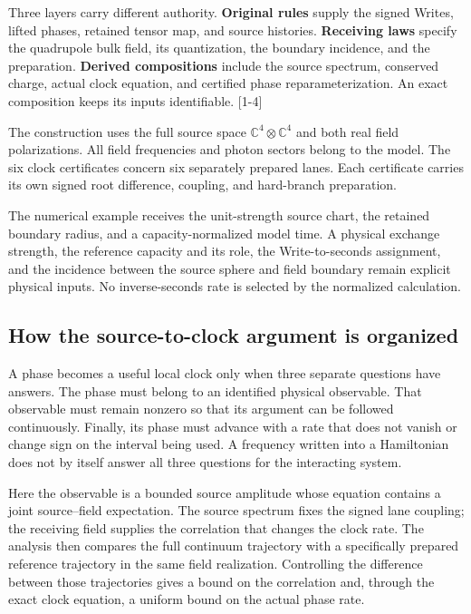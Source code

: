 \documentclass[10pt,twocolumn,letterpaper]{article}
\begin{document}
Three layers carry different authority. \textbf{Original rules} supply the signed Writes, lifted phases, retained tensor map, and source histories. \textbf{Receiving laws} specify the quadrupole bulk field, its quantization, the boundary incidence, and the preparation. \textbf{Derived compositions} include the source spectrum, conserved charge, actual clock equation, and certified phase reparameterization. An exact composition keeps its inputs identifiable. [1-4]

The construction uses the full source space $\mathbb{C}^{4}\otimes\mathbb{C}^{4}$ and both real field polarizations. All field frequencies and photon sectors belong to the model. The six clock certificates concern six separately prepared lanes. Each certificate carries its own signed root difference, coupling, and hard-branch preparation.

The numerical example receives the unit-strength source chart, the retained boundary radius, and a capacity-normalized model time. A physical exchange strength, the reference capacity and its role, the Write-to-seconds assignment, and the incidence between the source sphere and field boundary remain explicit physical inputs. No inverse-seconds rate is selected by the normalized calculation.

\subsection*{How the source-to-clock argument is organized}
A phase becomes a useful local clock only when three separate questions have answers. The phase must belong to an identified physical observable. That observable must remain nonzero so that its argument can be followed continuously. Finally, its phase must advance with a rate that does not vanish or change sign on the interval being used. A frequency written into a Hamiltonian does not by itself answer all three questions for the interacting system.

Here the observable is a bounded source amplitude whose equation contains a joint source--field expectation. The source spectrum fixes the signed lane coupling; the receiving field supplies the correlation that changes the clock rate. The analysis then compares the full continuum trajectory with a specifically prepared reference trajectory in the same field realization. Controlling the difference between those trajectories gives a bound on the correlation and, through the exact clock equation, a uniform bound on the actual phase rate.
\end{document}
